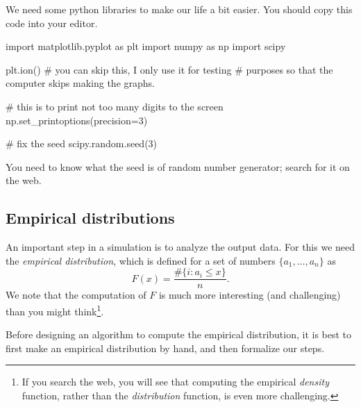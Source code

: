 We need some python libraries to make our life a bit easier. You should copy this code into your editor.

\begin{pyverbatim}
import matplotlib.pyplot as plt
import numpy as np
import scipy

plt.ion()  # you can skip this, I only use it for testing
           # purposes so that the computer skips making the graphs.

# this is to print not too many digits to the screen
np.set_printoptions(precision=3)

# fix the seed
scipy.random.seed(3)
\end{pyverbatim}

You need to know what the seed is of random number generator; search for it on the web.

\subsection{Empirical distributions}
\label{sec:empir-distr}

An important step in a simulation is to analyze the output data.
For this we need the \emph{empirical distribution}, which is defined for a set of numbers $\{a_1,\ldots, a_n\}$ as
  \begin{equation}
    \label{eq:1}
    F(x) = \frac{\# \{i : a_i \leq x\}}{n}.
  \end{equation}
We note that  the computation of $F$ is much more interesting (and challenging) than you might think\footnote{If you search the web, you will see that computing the empirical \emph{density} function, rather than the \emph{distribution} function, is even more challenging.}.

Before designing an algorithm to compute the empirical distribution, it is best to first make an empirical distribution by hand, and then formalize our steps.

